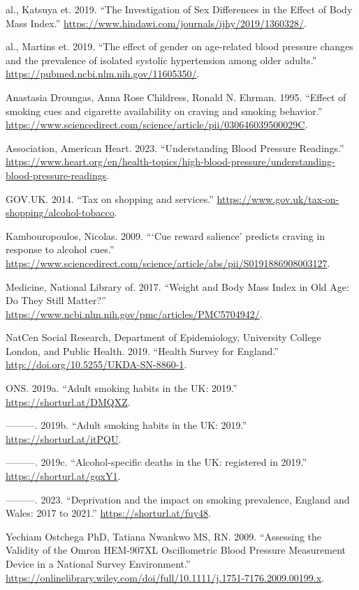 \documentclass[
  11pt,
  twocolumn]{article}
\newlength{\cslhangindent}
\newenvironment{CSLReferences}[2] %
 {\begin{list}{}{%
  \setlength{\itemindent}{0pt}
  \setlength{\leftmargin}{0pt}
  \setlength{\parsep}{0pt}
  \ifodd #1
   \setlength{\leftmargin}{\cslhangindent}
   \setlength{\itemindent}{-1\cslhangindent}
  \fi
  \setlength{\itemsep}{#2\baselineskip}}}
 {\end{list}}
\begin{document}
\label{refs}
\begin{CSLReferences}{1}{0}
al., Katsuya et. 2019. {``{The Investigation of Sex Differences in the
Effect of Body Mass Index}.''}
\url{https://www.hindawi.com/journals/ijhy/2019/1360328/}.

al., Martins et. 2019. {``{The effect of gender on age-related blood
pressure changes and the prevalence of isolated systolic hypertension
among older adults}.''} \url{https://pubmed.ncbi.nlm.nih.gov/11605350/}.

Anastasia Droungas, Anna Rose Childress, Ronald N. Ehrman. 1995.
{``{Effect of smoking cues and cigarette availability on craving and
smoking behavior}.''}
\url{https://www.sciencedirect.com/science/article/pii/030646039500029C}.

Association, American Heart. 2023. {``{Understanding Blood Pressure
Readings}.''}
\url{https://www.heart.org/en/health-topics/high-blood-pressure/understanding-blood-pressure-readings}.

GOV.UK. 2014. {``{Tax on shopping and services}.''}
\url{https://www.gov.uk/tax-on-shopping/alcohol-tobacco}.

Kambouropoulos, Nicolas. 2009. {``{{`Cue reward salience'} predicts
craving in response to alcohol cues}.''}
\url{https://www.sciencedirect.com/science/article/abs/pii/S0191886908003127}.

Medicine, National Library of. 2017. {``{Weight and Body Mass Index in
Old Age: Do They Still Matter?}''}
\url{https://www.ncbi.nlm.nih.gov/pmc/articles/PMC5704942/}.

NatCen Social Research, Department of Epidemiology, University College
London, and Public Health. 2019. {``{Health Survey for England}.''}
\url{http://doi.org/10.5255/UKDA-SN-8860-1}.

ONS. 2019a. {``{Adult smoking habits in the UK: 2019}.''}
\url{https://shorturl.at/DMQXZ}.

---------. 2019b. {``{Adult smoking habits in the UK: 2019}.''}
\url{https://shorturl.at/itPQU}.

---------. 2019c. {``{Alcohol-specific deaths in the UK: registered in
2019}.''} \url{https://shorturl.at/gqxY1}.

---------. 2023. {``{Deprivation and the impact on smoking prevalence,
England and Wales: 2017 to 2021}.''} \url{https://shorturl.at/fuy48}.

Yechiam Ostchega PhD, Tatiana Nwankwo MS, RN. 2009. {``{Assessing the
Validity of the Omron HEM-907XL Oscillometric Blood Pressure Measurement
Device in a National Survey Environment}.''}
\url{https://onlinelibrary.wiley.com/doi/full/10.1111/j.1751-7176.2009.00199.x}.

\end{CSLReferences}
\end{document}
